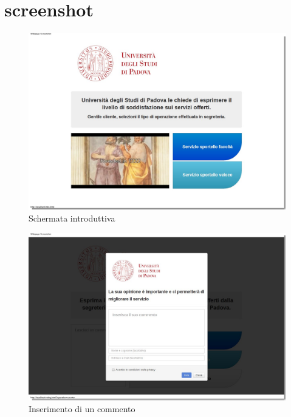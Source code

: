 \section{screenshot}
    \begin{figure}[!h]
    \begin{center}
        \includegraphics[scale=0.32]{icons/scorecard.png}
        \caption{Schermata introduttiva}
        \label{fig:scorecard}
    \end{center}
  \end{figure}
   \begin{figure}[!h]
    \begin{center}
        \includegraphics[scale=0.32]{icons/comment.png} 
        \caption{Inserimento di un commento}
        \label{fig:comment}
    \end{center}
  \end{figure}
